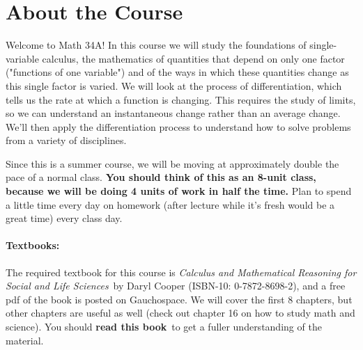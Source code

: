 \documentclass[11pt,letterpaper]{article}
\begin{document}
\section*{About the Course}
Welcome to Math 34A! In this course we will study the foundations of single-variable calculus, the mathematics of quantities that depend on only one factor ("functions of one variable") and of the ways in which these quantities change as this single factor is varied. We will look at the process of differentiation, which tells us the rate at which a function is changing. This requires the study of limits, so we can understand an instantaneous change rather than an average change. We'll then apply the differentiation process to understand how to solve problems from a variety of disciplines.

Since this is a summer course, we will be moving at approximately double the pace of a normal class. \textbf{You should think of this as an 8-unit class, because we will be doing 4 units of work in half the time.} Plan to spend a little time every day on homework (after lecture while it's fresh would be a great time) every class day.



\paragraph*{Textbooks:}
The required textbook for this course is \emph{Calculus and
  Mathematical Reasoning for Social and Life Sciences}\ by Daryl
Cooper (ISBN-10: 0-7872-8698-2), and a free pdf of the book is posted on Gauchospace.  We will cover the first 8 chapters, but other chapters are useful as well (check out chapter 16 on how to study math
and science).  You should \textbf{read this book}\ to get a fuller
understanding of the material.

\pagebreak
\end{document}
